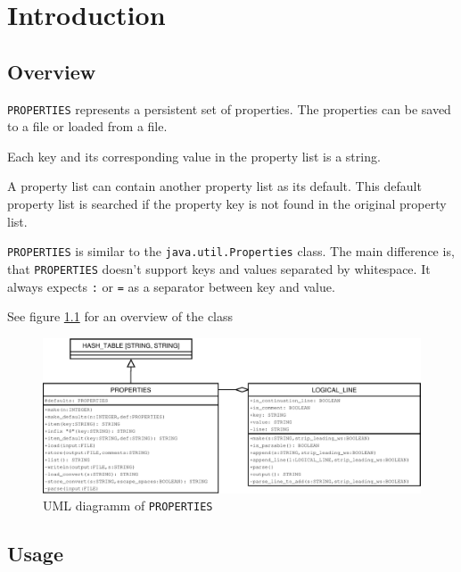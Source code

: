 \documentclass[a4paper,fleqn]{report}
\begin{document}
\clearpage
\tableofcontents

\clearpage
\listoffigures

\chapter{Introduction}
\label{cha:introduction}


\setcounter{page}{0} 



\section{Overview}
\label{sec:overview}

\texttt{PROPERTIES} represents a persistent set of properties. The
properties can be saved to a file or loaded from a file.

Each key and its corresponding value in the property list is a string.

A property list can contain another property list as its default. This
default property list is searched if the property key is not found in
the original property list.

\texttt{PROPERTIES} is similar to the \texttt{java.util.Properties}
class. The main difference is, that \texttt{PROPERTIES} doesn't
support keys and values separated by whitespace. It always expects
\texttt{:} or \texttt{=} as a separator between key and value.

See figure \ref{fig:uml-diagram} for an overview of the class

\begin{figure}[htbp]
  \centering
  \includegraphics[width=\textwidth]{./figures/uml}
  \caption{UML diagramm of \texttt{PROPERTIES}}
  \label{fig:uml-diagram}
\end{figure}


\section{Usage}
\label{sec:usage}
\end{document}
